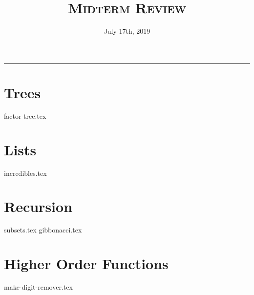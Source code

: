 \documentclass{exam}
\title{\textsc{Midterm Review}}
\date{July 17th, 2019}
\begin{document}
\maketitle
\rule{\textwidth}{0.15em}
\fontsize{12}{15}\selectfont


\section{Trees}
\begin{questions}
{factor-tree.tex}
\end{questions}


\section{Lists}
\begin{questions}
{incredibles.tex}

\end{questions}

\section{Recursion}
\begin{questions}
{subsets.tex}
{gibbonacci.tex}
\end{questions}

\section{Higher Order Functions}
\begin{questions}
{make-digit-remover.tex}
\end{questions}








\end{document}
